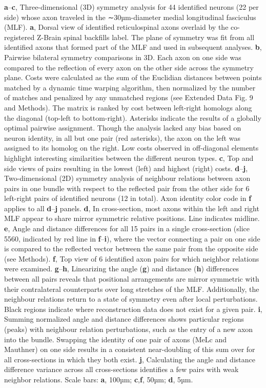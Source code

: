 \documentclass{article}
\begin{document}
\noindent\textbf{a}–\textbf{c}, Three-dimensional (3D) symmetry analysis for 44 identified neurons (22 per side) whose axon traveled in the ∼30µm-diameter medial longitudinal fasciculus (MLF). \textbf{a}, Dorsal view of identified reticulospinal axons overlaid by the co-registered Z-Brain spinal backfills label. The plane of symmetry was fit from all identified axons that formed part of the MLF and used in subsequent analyses. \textbf{b}, Pairwise bilateral symmetry comparisons in 3D. Each axon on one side was compared to the reflection of every axon on the other side across the symmetry plane. Costs were calculated as the sum of the Euclidian distances between points matched by a dynamic time warping algorithm, then normalized by the number of matches and penalized by any unmatched regions (see Extended Data Fig. 9 and Methods). The matrix is ranked by cost between left-right homologs along the diagonal (top-left to bottom-right). Asterisks indicate the results of a globally optimal pairwise assignment. Though the analysis lacked any bias based on neuron identity, in all but one pair (red asterisks), the axon on the left was assigned to its homolog on the right. Low costs observed in off-diagonal elements highlight interesting similarities between the different neuron types. \textbf{c}, Top and side views of pairs resulting in the lowest (left) and highest (right) costs. \textbf{d}–\textbf{j}, Two-dimensional (2D) symmetry analysis of neighbour relations between axon pairs in one bundle with respect to the reflected pair from the other side for 6 left-right pairs of identified neurons (12 in total). Axon identity color code in \textbf{f} applies to all \textbf{d}–\textbf{j} panels. \textbf{d}, In cross-section, most axons within the left and right MLF appear to share mirror symmetric
relative positions. Line indicates midline. \textbf{e}, Angle and distance differences for all 15 pairs in a single cross-section (slice 5560, indicated by red line in \textbf{f}–\textbf{i}), where the vector connecting a pair on one side is compared to the reflected vector between the same pair from the opposite side (see Methods). \textbf{f}, Top view of 6 identified axon pairs for which neighbor relations were examined. \textbf{g}–\textbf{h}, Linearizing the angle (\textbf{g}) and distance (\textbf{h}) differences between all pairs reveals that positional arrangements are mirror symmetric with their contralateral counterparts over long stretches of the MLF. Additionally, the neighbour relations return to a state of symmetry even after local perturbations. Black regions indicate where reconstruction data does not exist for a given pair. \textbf{i}, Summing normalized angle and distance differences shows particular regions (peaks) with neighbour relation perturbations, such as the entry of a new axon into the bundle. Swapping the identity of one pair of axons (MeLc and Mauthner) on one side results in a consistent near-doubling of this sum over for all cross-sections in which they both exist. \textbf{j}, Calculating the angle and distance difference variance across all cross-sections identifies a few pairs with weak neighbor relations. Scale bars: \textbf{a}, 100µm; \textbf{c},\textbf{f}, 50µm; \textbf{d}, 5µm.
\end{document}

